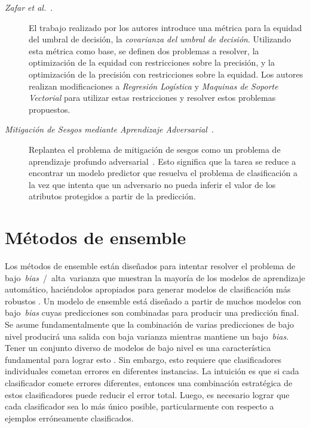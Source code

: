 \begin{description}
\item[\emph{Zafar et al.}~\parencite{zafar2017fairness}.] El trabajo realizado por  los autores introduce una métrica para la equidad del umbral de decisión, la \emph{covarianza del umbral de decisión}.
Utilizando esta métrica como base, se definen dos problemas a resolver, la optimización de la equidad con restricciones sobre la precisión, y la optimización de la precisión con restricciones sobre la equidad.
Los autores realizan modificaciones a \emph{Regresión Logística} y \emph{Maquinas de Soporte Vectorial} para utilizar estas restricciones y resolver estos problemas propuestos.

\item[\emph{Mitigación de Sesgos mediante Aprendizaje Adversarial}~\parencite{zhang2018mitigating}.] Replantea el problema de mitigación de sesgos como un problema de aprendizaje profundo adversarial~\parencite{goodfellow2014adversarial}.
Esto significa que la tarea se reduce a encontrar un modelo predictor que resuelva el problema de clasificación a la vez que intenta que un adversario no pueda inferir el valor de los atributos protegidos a partir de la predicción.

\end{description}

\section{Métodos de ensemble}\label{section:ensembles}

Los métodos de ensemble están diseñados para intentar resolver el problema de bajo~\emph{bias}~/~alta~varianza que muestran la mayoría de los modelos de aprendizaje automático, haciéndolos apropiados para generar modelos de clasificación más robustos \parencite{polikar2006ensemble}.
Un modelo de ensemble está diseñado a partir de muchos modelos con bajo~\emph{bias} cuyas predicciones son combinadas para producir una predicción final.
Se asume fundamentalmente que la combinación de varias predicciones de bajo nivel producirá una salida con baja varianza mientras mantiene un bajo~\emph{bias}.
Tener un conjunto diverso de modelos de bajo nivel es una característica fundamental para lograr esto \parencite{polikar2006ensemble}.
Sin embargo, esto requiere que clasificadores individuales cometan errores en diferentes instancias.
La intuición es que si cada clasificador comete errores diferentes, entonces una combinación estratégica de estos clasificadores puede reducir el error total. Luego, es necesario lograr que cada clasificador sea lo más único posible, particularmente con respecto a ejemplos erróneamente clasificados.

